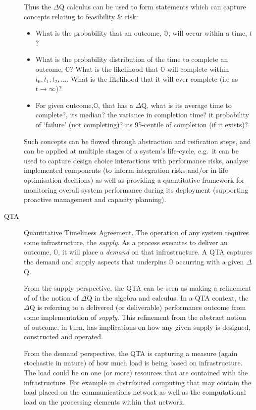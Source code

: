 \documentclass[11pt,a4paper]{article}
\begin{document}
\begin{description}
   Thus the $\Delta$Q calculus can be used to form statements which
   can capture concepts relating to feasibility \& risk:
   \begin{itemize}
     \item What is the probability that an outcome, $\mathbb{O}$, will
       occur within a time, $t$?
     \item What is the probability distribution of the time to
       complete an outcome, $\mathbb{O}$? What is the likelihood that
       $\mathbb{O}$ will complete within $t_0, t_1, t_2, ...$. What is
       the likelihood that it will ever complete (i.e as
       $t\to\infty$)?
     \item For given outcome,$\mathbb{O}$, that has a $\Delta$Q,
       what is its average time to complete?, its median? the variance
       in completion time? it probability of `failure' (not
       completing)? its 95-centile of completion (if it exists)?
   \end{itemize}
	  
  Such concepts can be flowed through abstraction and reification
  steps, and can be applied at multiple stages of a system's
  life-cycle, e.g.\ it can be used to capture design choice
  interactions with performance risks, analyse implemented components
  (to inform integration risks and/or in-life optimisation decisions)
  as well as providing a quantitative framework for monitoring overall
  system performance during its deployment (supporting proactive
  management and capacity planning).
     
\item[QTA] Quantitative Timeliness Agreement. The operation of any
  system requires some infrastructure, the \textit{supply}. As a
  process executes to deliver an outcome, $\mathbb{O}$, it will place
  a \textit{demand} on that infrastructure. A QTA captures the demand
  and supply aspects that underpins $\mathbb{O}$ occurring with a
  given $\Delta$Q.
  
  From the supply perspective, the QTA can be seen as making a
  refinement of of the notion of $\Delta$Q in the algebra and calculus.
  In a QTA context, the $\Delta$Q is referring to a delivered (or
  deliverable) performance outcome from some implementation of
  \textit{supply}.  This refinement from the abstract notion of
  outcome, in turn, has implications on how any given supply is
  designed, constructed and operated.
  
  From the demand perspective, the QTA is capturing a measure (again
  stochastic in nature) of how much load is being based on
  infrastructure.  The load could be on one (or more) resources that
  are contained with the infrastructure. For example in distributed
  computing that may contain the load placed on the communications
  network as well as the computational load on the processing elements
  within that network.
     

\end{description}
\end{document}
